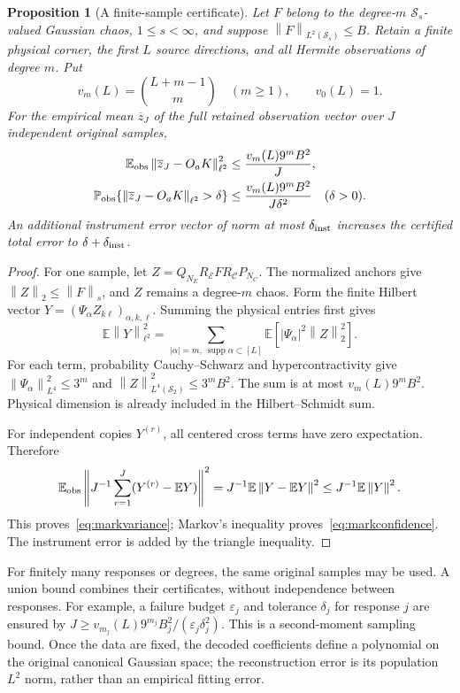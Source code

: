 \documentclass[11pt,a4paper]{amsart}
\numberwithin{equation}{section}
\newtheorem{proposition}[theorem]{Proposition}
\theoremstyle{definition}
\theoremstyle{remark}
\newcommand{\E}{\mathbb E}
\newcommand{\Prob}{\mathbb P}
\newcommand{\cC}{\mathcal C}
\newcommand{\cE}{\mathcal E}
\newcommand{\Sch}{\mathcal S}
\newcommand{\norm}[1]{\left\lVert#1\right\rVert}
\begin{document}
\begin{proposition}[A finite-sample certificate]\label{prop:empiricalmarks}
Let $F$ belong to the degree-$m$ $\Sch_s$-valued Gaussian chaos, $1\le s<\infty$, and suppose $\norm F_{L^2(\Sch_s)}\le B$. Retain a finite physical corner, the first $L$ source directions, and all Hermite observations of degree $m$. Put
\[
 v_m(L)=\binom{L+m-1}{m}\quad(m\ge1),\qquad v_0(L)=1.
\]
For the empirical mean $\overline z_J$ of the full retained observation vector over $J$ independent original samples,
\begin{align}
 \E_{\rm obs}\norm{\overline z_J-O_aK}_{\ell^2}^2
 &\le\frac{v_m(L)9^mB^2}{J},\label{eq:markvariance}\\
 \Prob_{\rm obs}\{\norm{\overline z_J-O_aK}_{\ell^2}>\delta\}
 &\le\frac{v_m(L)9^mB^2}{J\delta^2}\quad(\delta>0).\label{eq:markconfidence}
\end{align}
An additional instrument error vector of norm at most $\delta_{\rm inst}$ increases the certified total error to $\delta+\delta_{\rm inst}$.
\end{proposition}
\begin{proof}
For one sample, let
$Z=Q_{N_E}R_\cE FR_\cC P_{N_C}$.
The normalized anchors give $\norm Z_2\le\norm F_s$, and $Z$ remains a degree-$m$ chaos. Form the finite Hilbert vector
$Y=(\Psi_\alpha Z_{k\ell})_{\alpha,k,\ell}$. Summing the physical entries first gives
\[
 \E\norm Y_{\ell^2}^2
 =\sum_{|\alpha|=m,\ \operatorname{supp}\alpha\subset[L]}
     \E[|\Psi_\alpha|^2\norm Z_2^2].
\]
For each term, probability Cauchy--Schwarz and hypercontractivity give
$\norm{\Psi_\alpha}_{L^4}^2\le3^m$ and
$\norm Z_{L^4(\Sch_2)}^2\le3^mB^2$.
The sum is at most $v_m(L)9^mB^2$. Physical dimension is already included in the Hilbert--Schmidt sum.

For independent copies $Y^{(r)}$, all centered cross terms have zero expectation. Therefore
\[
 \E_{\rm obs}\left\|J^{-1}\sum_{r=1}^J(Y^{(r)}-\E Y)\right\|^2
 =J^{-1}\E\norm{Y-\E Y}^2\le J^{-1}\E\norm Y^2.
\]
This proves~\eqref{eq:markvariance}; Markov's inequality proves~\eqref{eq:markconfidence}. The instrument error is added by the triangle inequality.
\end{proof}

For finitely many responses or degrees, the same original samples may be used. A union bound combines their certificates, without independence between responses. For example, a failure budget $\varepsilon_j$ and tolerance $\delta_j$ for response $j$ are ensured by
$J\ge v_{m_j}(L)9^{m_j}B_j^2/(\varepsilon_j\delta_j^2)$.
This is a second-moment sampling bound. Once the data are fixed, the decoded coefficients define a polynomial on the original canonical Gaussian space; the reconstruction error is its population $L^2$ norm, rather than an empirical fitting error.
\end{document}
